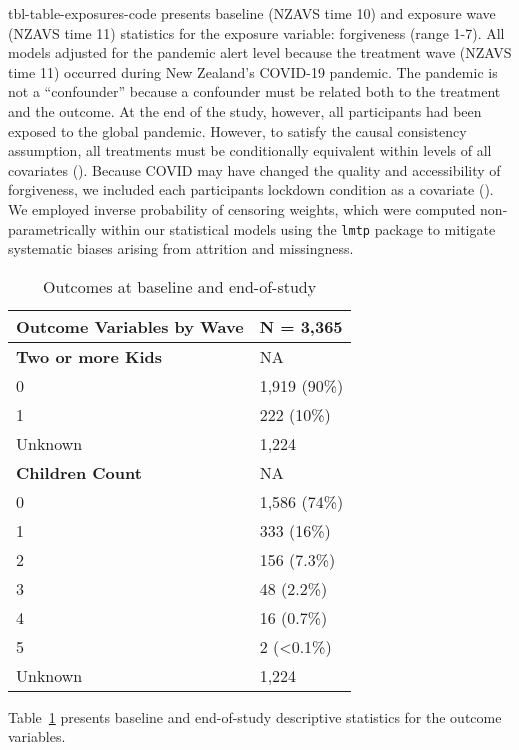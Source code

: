 \documentclass[
  single column]{article}
\begin{document}
tbl-table-exposures-code presents baseline (NZAVS time 10) and exposure
wave (NZAVS time 11) statistics for the exposure variable: forgiveness
(range 1-7). All models adjusted for the pandemic alert level because
the treatment wave (NZAVS time 11) occurred during New Zealand's
COVID-19 pandemic. The pandemic is not a ``confounder'' because a
confounder must be related both to the treatment and the outcome. At the
end of the study, however, all participants had been exposed to the
global pandemic. However, to satisfy the causal consistency assumption,
all treatments must be conditionally equivalent within levels of all
covariates (). Because COVID may have changed the quality and accessibility of
forgiveness, we included each participants lockdown condition as a
covariate (). We employed inverse
probability of censoring weights, which were computed non-parametrically
within our statistical models using the \texttt{lmtp} package to
mitigate systematic biases arising from attrition and missingness.

\newpage{}

\begin{longtable}[]{@{}ll@{}}

\caption{\label{tbl-table-outcomes}Outcomes at baseline and
end-of-study}

\tabularnewline

\toprule\noalign{}
\textbf{Outcome Variables by Wave} & \textbf{N = 3,365} \\
\midrule\noalign{}
\endhead
\bottomrule\noalign{}
\endlastfoot
\textbf{Two or more Kids} & NA \\
0 & 1,919 (90\%) \\
1 & 222 (10\%) \\
Unknown & 1,224 \\
\textbf{Children Count} & NA \\
0 & 1,586 (74\%) \\
1 & 333 (16\%) \\
2 & 156 (7.3\%) \\
3 & 48 (2.2\%) \\
4 & 16 (0.7\%) \\
5 & 2 (\textless0.1\%) \\
Unknown & 1,224 \\

\end{longtable}

Table~\ref{tbl-table-outcomes} presents baseline and end-of-study
descriptive statistics for the outcome variables.
\end{document}

